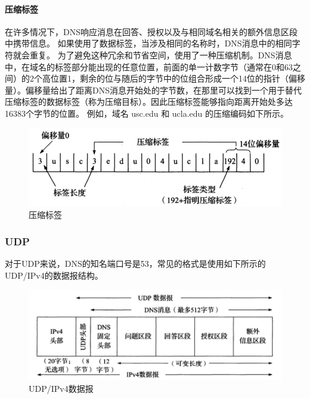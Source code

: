 \documentclass[]{article}
\begin{document}
            \paragraph{压缩标签}
                在许多情况下，DNS响应消息在回答、授权以及与相同域名相关的额外信息区段中携带信息。
                如果使用了数据标签，当涉及相同的名称时，DNS消息中的相同字符就会重复。
                为了避免这种冗余和节省空间，使用了一种压缩机制。DNS消息中，在域名的标签部分能出现的任意位置，前面的单一计数字节（通常在0和63之间）的2个高位置1，剩余的位与随后的字节中的位组合形成一个14位的指针（偏移量）。偏移量给出了距离DNS消息开始处的字节数，在那里可以找到一个用于替代压缩标签的数据标签（称为压缩目标）。因此压缩标签能够指向距离开始处多达16383个字节的位置。
                例如，域名 usc.edu 和 ucla.edu 的压缩编码如下所示。
                \begin{figure}[ht]
                    \centering
                    \includegraphics[scale=0.6]{ziplabel.png}
                    \caption{压缩标签}
                \end{figure}
        
        \subsubsection{UDP}
            对于UDP来说，DNS的知名端口号是53，常见的格式是使用如下所示的UDP/IPv4的数据报结构。
            \begin{figure}[ht]
                \centering
                \includegraphics[scale=0.6]{udp.png}
                \caption{UDP/IPv4数据报}
            \end{figure}
\end{document}
